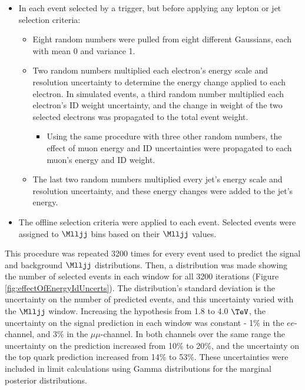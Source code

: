 \begin{itemize}
	\item In each event selected by a trigger, but before applying any lepton or jet selection criteria:
	\begin{itemize}
		\item Eight random numbers were pulled from eight different Gaussians, each with mean 0 and variance 1.
		\item Two random numbers multiplied each electron's energy scale and resolution uncertainty to determine the 
			energy change applied to each electron.  In simulated events, a third random number multiplied 
			each electron's ID weight uncertainty, and the change in weight of the two selected electrons was propagated 
			to the total event weight.
		\begin{itemize}
			\item Using the same procedure with three other random numbers, the effect of muon energy and ID uncertainties 
				were propagated to each muon's energy and ID weight.
		\end{itemize}
		\item The last two random numbers multiplied every jet's energy scale and resolution uncertainty, and these 
			energy changes were added to the jet's energy.
	\end{itemize}
	\item The offline selection criteria were applied to each event.  Selected events were assigned to $\Mlljj$ 
		bins based on their $\Mlljj$ values.
\end{itemize}

This procedure was repeated 3200 times for every event used to predict the signal and background $\Mlljj$ distributions.  
Then, a distribution was made showing the number of selected events in each window for all 3200 iterations (Figure 
\ref{fig:effectOfEnergyIdUncerts}).  The distribution's standard deviation is the uncertainty on the number of predicted 
events, and this uncertainty varied with the $\Mlljj$ window.  Increasing the \mWR hypothesis from 1.8 to 4.0 $\TeV$, the 
uncertainty on the signal prediction in each window was constant - 1\% in the $ee$-channel, and 3\% in the 
$\mu\mu$-channel.  In both channels over the same \mWR range the uncertainty on the \DY prediction increased from 10\% to 
20\%, and the uncertainty on the top quark prediction increased from 14\% to 53\%.  These uncertainties were included in 
limit calculations using Gamma distributions for the marginal posterior distributions.

